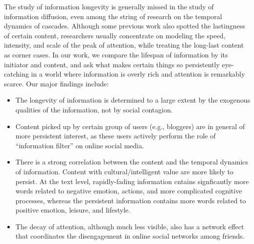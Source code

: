 \documentclass[phd,tocprelim]{cornell}
\begin{document}
The study of information longevity is generally missed in the study of information diffusion, even among the string of research on the temporal dynamics of cascades\cite{Yang-2011,crane:2008,Leskovec:2005}. Although some previous work also spotted the lastingness of certain content\cite{crane:2008,Szabo-2010}, researchers usually concentrate on modeling the speed, intensity, and scale of the peak of attention, while treating the long-last content as corner cases.
In our work, we compare the lifespan of information by its initiator and content, and ask what makes certain things so persistently eye-catching in a world where information is overly rich and attention is remarkably scarce\cite{Simon-1971}. Our major findings include:
\begin{itemize}
\item The longevity of information is determined to a large extent by the exogenous qualities of the information, not by social contagion. 
\item Content picked up by certain group of users (e.g., bloggers) are in general of more persistent interest, as these users actively perform the role of ``information filter'' on online social media.
\item There is a strong correlation between the content and the temporal dynamics of information. Content with cultural/intelligent value are more likely to persist. At the text level, rapidly-fading information cntains signficantly more words related to negative emotion, actions, and more complicated cognitive processes, whereas the persistent information contains more words related to positive emotion, leisure, and lifestyle.
\item The decay of attention, although much less visible, also has a network effect that coordinates the disengagement in online social networks among friends.
\end{itemize}
\end{document}
